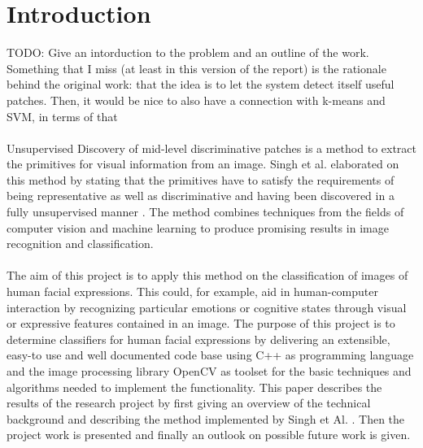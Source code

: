 
\section{Introduction}\label{sec:Introduction}

TODO: Give an intorduction to the problem and an outline of the work. Something that I miss (at least in this version of the report) is the rationale behind the original work: that the idea is to let the system detect itself useful patches. Then, it would be nice to also have a connection with k-means and SVM, in terms of that
\\
\\
Unsupervised Discovery of mid-level discriminative patches is a method to extract the primitives for visual information from an image.  Singh et al. elaborated on this method by stating that the primitives have to satisfy the requirements of being representative as well as discriminative and having been discovered in a fully unsupervised manner \cite{Singh2012DiscPat}. The method combines techniques from the fields of computer vision and machine learning to produce promising results in image recognition and classification. 
\\
\\
The aim of this project is to apply this method on the classification of images of human facial expressions. This could, for example, aid in human-computer interaction by recognizing particular emotions or cognitive states through visual or expressive features contained in an image. The purpose of this project is to determine classifiers for human facial expressions by delivering an extensible, easy-to use and well documented code base using C++ as programming language and the image processing library OpenCV as toolset for the basic techniques and algorithms needed to implement the functionality. This paper describes the results of the research project by first giving an overview of the technical background and describing the method implemented by Singh et Al. \cite{Singh2012DiscPat}. Then the project work is presented and finally an outlook on possible future work is given.